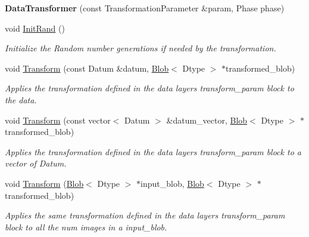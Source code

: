 \begin{DoxyCompactItemize}
\item 
{\bfseries Data\+Transformer} (const Transformation\+Parameter \&param, Phase phase)\hypertarget{classcaffe_1_1DataTransformer_ae598f617042b2d68f4bab0dd3bd542f0}{}\label{classcaffe_1_1DataTransformer_ae598f617042b2d68f4bab0dd3bd542f0}

\item 
void \hyperlink{classcaffe_1_1DataTransformer_a6d807c7dc250e66b62d97d9847278e68}{Init\+Rand} ()\hypertarget{classcaffe_1_1DataTransformer_a6d807c7dc250e66b62d97d9847278e68}{}\label{classcaffe_1_1DataTransformer_a6d807c7dc250e66b62d97d9847278e68}

\begin{DoxyCompactList}\small\item\em Initialize the Random number generations if needed by the transformation. \end{DoxyCompactList}\item 
void \hyperlink{classcaffe_1_1DataTransformer_a1626db49587d506a91e7b70373ace816}{Transform} (const Datum \&datum, \hyperlink{classcaffe_1_1Blob}{Blob}$<$ Dtype $>$ $\ast$transformed\+\_\+blob)
\begin{DoxyCompactList}\small\item\em Applies the transformation defined in the data layer\textquotesingle{}s transform\+\_\+param block to the data. \end{DoxyCompactList}\item 
void \hyperlink{classcaffe_1_1DataTransformer_a082cad626c5f51c9f8d93bb88cca1bd0}{Transform} (const vector$<$ Datum $>$ \&datum\+\_\+vector, \hyperlink{classcaffe_1_1Blob}{Blob}$<$ Dtype $>$ $\ast$transformed\+\_\+blob)
\begin{DoxyCompactList}\small\item\em Applies the transformation defined in the data layer\textquotesingle{}s transform\+\_\+param block to a vector of Datum. \end{DoxyCompactList}\item 
void \hyperlink{classcaffe_1_1DataTransformer_a168abf1bf9466420da6968178c6edb4d}{Transform} (\hyperlink{classcaffe_1_1Blob}{Blob}$<$ Dtype $>$ $\ast$input\+\_\+blob, \hyperlink{classcaffe_1_1Blob}{Blob}$<$ Dtype $>$ $\ast$transformed\+\_\+blob)
\begin{DoxyCompactList}\small\item\em Applies the same transformation defined in the data layer\textquotesingle{}s transform\+\_\+param block to all the num images in a input\+\_\+blob. \end{DoxyCompactList}\item 

\end{DoxyCompactItemize}
